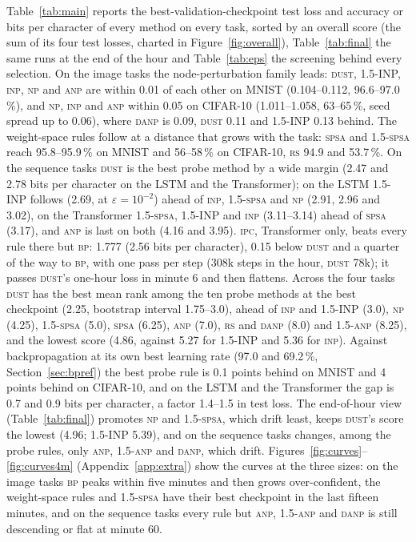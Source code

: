 \documentclass{article}
\newcommand{\method}[1]{\textsc{#1}}
\newcommand{\BP}{\method{bp}}
\newcommand{\SPSA}{\method{spsa}}
\newcommand{\SPSAb}{\method{1.5-spsa}}
\newcommand{\RS}{\method{rs}}
\newcommand{\NP}{\method{np}}
\newcommand{\ANP}{\method{anp}}
\newcommand{\ANPb}{\method{1.5-anp}}
\newcommand{\INP}{\method{inp}}
\newcommand{\DANP}{\method{danp}}
\newcommand{\DUST}{\method{dust}}
\newcommand{\IPC}{\method{ipc}}
\begin{document}
Table~\ref{tab:main} reports the best-validation-checkpoint test loss and accuracy or
bits per character of every method on every task, sorted by an overall score (the
sum of its four test losses, charted in Figure~\ref{fig:overall}), Table~\ref{tab:final} the same runs
at the end of the hour and Table~\ref{tab:eps} the screening behind every selection. On the image tasks the node-perturbation family leads: \DUST{}, 1.5-INP, \INP{}, \NP{} and \ANP{}
are within 0.01 of each other on MNIST (0.104--0.112, 96.6--97.0\,\%), and \NP{},
\INP{} and \ANP{} within 0.05 on CIFAR-10 (1.011--1.058, 63--65\,\%, seed spread up to
0.06), where \DANP{} is 0.09, \DUST{} 0.11 and 1.5-INP 0.13 behind. The weight-space rules follow at a
distance that grows with the task: \SPSA{} and \SPSAb{} reach 95.8--95.9\,\% on MNIST
and 56--58\,\% on CIFAR-10, \RS{} 94.9 and 53.7\,\%. On the sequence tasks \DUST{} is
the best probe method by a wide margin (2.47 and 2.78 bits per character on the LSTM and the
Transformer); on the LSTM 1.5-INP follows (2.69, at $\varepsilon=10^{-2}$)
ahead of \INP{}, \SPSAb{} and \NP{} (2.91, 2.96 and 3.02), on the Transformer \SPSAb{}, 1.5-INP and
\INP{} (3.11--3.14) ahead of \SPSA{} (3.17), and
\ANP{} is last on both (4.16 and 3.95). \IPC{}, Transformer only, beats every rule there but
\BP{}: 1.777 (2.56 bits per character), 0.15 below \DUST{} and a quarter of the way to \BP{},
with one pass per step (308k steps in the hour, \DUST{} 78k); it passes \DUST{}'s one-hour
loss in minute 6 and then flattens. Across the four tasks \DUST{} has
the best mean rank among the ten probe methods at the best checkpoint (2.25, bootstrap
interval 1.75--3.0), ahead of \INP{} and 1.5-INP (3.0), \NP{} (4.25), \SPSAb{} (5.0), \SPSA{}
(6.25), \ANP{} (7.0), \RS{} and \DANP{} (8.0) and \ANPb{} (8.25), and the
lowest score (4.86, against 5.27 for 1.5-INP and 5.36 for \INP{}). Against backpropagation at its own best learning rate
(97.0 and 69.2\,\%, Section~\ref{sec:bpref}) the best probe rule is 0.1 points behind on
MNIST and 4 points behind on CIFAR-10, and on the LSTM and the Transformer the gap is 0.7
and 0.9 bits per character, a factor 1.4--1.5 in test loss. The end-of-hour view
(Table~\ref{tab:final}) promotes \NP{} and \SPSAb{}, which drift least, keeps \DUST{}'s
score the lowest (4.96; 1.5-INP 5.39), and on the sequence tasks changes, among the probe rules, only
\ANP{}, \ANPb{} and \DANP{}, which drift. Figures~\ref{fig:curves}--\ref{fig:curves4m} (Appendix~\ref{app:extra}) show the curves at the three
sizes: on the image tasks \BP{} peaks
within five minutes and then grows over-confident, the weight-space rules and
\SPSAb{} have their best checkpoint in the last fifteen minutes, and on the sequence
tasks every rule but \ANP{}, \ANPb{} and \DANP{} is still descending or flat at minute 60.
\end{document}
